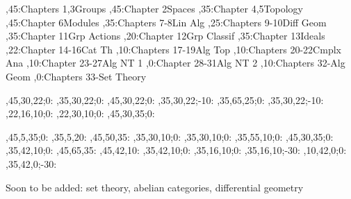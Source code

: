 
\setcounter{diagheight}{50}
\begin{chart}
,45:{Chapters 1,3}{Groups}{}
,45:{Chapter 2}{Spaces}{}
,35:{Chapter 4,5}{Topology}{}
,45:{Chapter 6}{Modules}{}
,35:{Chapters 7-8}{Lin Alg}{}
,25:{Chapters 9-10}{Diff Geom}{}
,35:{Chapter 11}{Grp Actions}{}
,20:{Chapter 12}{Grp Classif}{}
,35:{Chapter 13}{Ideals}{}
,22:{Chapter 14-16}{Cat Th}{}
,10:{Chapters 17-19}{Alg Top}{}
,10:{Chapters 20-22}{Cmplx Ana}{}
,10:{Chapter 23-27}{Alg NT 1}{}
,0:{Chapter 28-31}{Alg NT 2}{}
,10:{Chapters 32-}{Alg Geom}{}
,0:{Chapters 33-}{Set Theory}{}

,45,30,22;0:   %
,35,30,22;0:   %
,45,30,22;0:   %
,35,30,22;-10: %
,35,65,25;0:   %
,35,30,22;-10: %
,22,16,10;0:   %
,22,30,10;0:   %
,45,30,35;0:   %

,45,5,35;0:    %
,35,5,20:      %
,45,50,35:     %
,35,30,10;0:   %
,35,30,10;0:   %
,35,55,10;0:   %
,45,30,35;0:   %
,35,42,10;0:   %
,45,65,35:     %
,45,42,10:     %
,35,42,10;0:   %
,35,16,10;0:   %
,35,16,10;-30: %
,10,42,0;0:    %
,35,42,0;-30:  %
\end{chart}

Soon to be added: set theory, abelian categories, differential geometry
